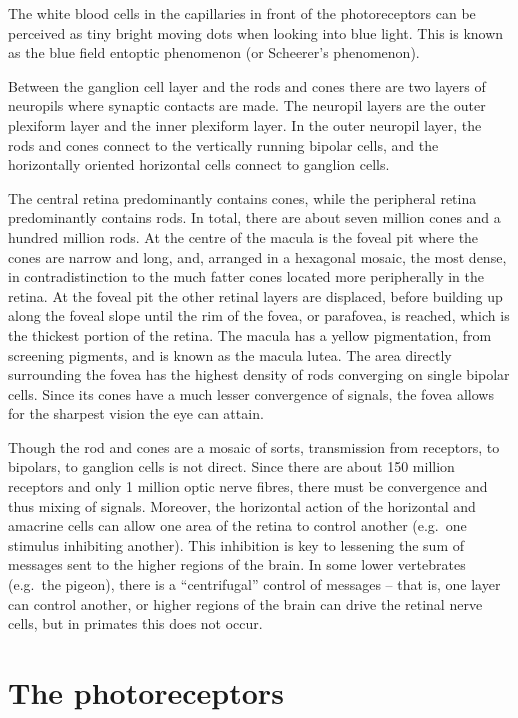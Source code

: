 \documentclass[]{book}
\begin{document}
The white blood cells in the capillaries in front of the photoreceptors can be perceived as tiny bright moving dots when looking into blue light. This is known as the blue field entoptic phenomenon (or Scheerer's phenomenon).

Between the ganglion cell layer and the rods and cones there are two layers of neuropils where synaptic contacts are made. The neuropil layers are the outer plexiform layer and the inner plexiform layer. In the outer neuropil layer, the rods and cones connect to the vertically running bipolar cells, and the horizontally oriented horizontal cells connect to ganglion cells.

The central retina predominantly contains cones, while the peripheral retina predominantly contains rods. In total, there are about seven million cones and a hundred million rods. At the centre of the macula is the foveal pit where the cones are narrow and long, and, arranged in a hexagonal mosaic, the most dense, in contradistinction to the much fatter cones located more peripherally in the retina. At the foveal pit the other retinal layers are displaced, before building up along the foveal slope until the rim of the fovea, or parafovea, is reached, which is the thickest portion of the retina. The macula has a yellow pigmentation, from screening pigments, and is known as the macula lutea. The area directly surrounding the fovea has the highest density of rods converging on single bipolar cells. Since its cones have a much lesser convergence of signals, the fovea allows for the sharpest vision the eye can attain.

Though the rod and cones are a mosaic of sorts, transmission from receptors, to bipolars, to ganglion cells is not direct. Since there are about 150 million receptors and only 1 million optic nerve fibres, there must be convergence and thus mixing of signals. Moreover, the horizontal action of the horizontal and amacrine cells can allow one area of the retina to control another (e.g.~one stimulus inhibiting another). This inhibition is key to lessening the sum of messages sent to the higher regions of the brain. In some lower vertebrates (e.g.~the pigeon), there is a ``centrifugal'' control of messages -- that is, one layer can control another, or higher regions of the brain can drive the retinal nerve cells, but in primates this does not occur.

\hypertarget{the-photoreceptors}{%
\section{The photoreceptors}\label{the-photoreceptors}}
\end{document}
